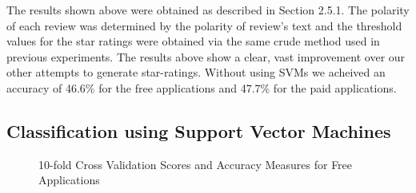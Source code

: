 \documentclass[11pt]{report} %
\begin{document}
The results shown above were obtained as described in Section 2.5.1. The polarity of each review was determined by the polarity of review's text and the threshold values for the star ratings were obtained via the same crude method used in previous experiments. The results above show a clear, vast improvement over our other attempts to generate star-ratings. Without using SVMs we acheived an accuracy of 46.6\% for the free applications and 47.7\% for the paid applications.  

\newpage

		\subsection{Classification using Support Vector Machines}

\begin{figure}[h!]
\centering
{}
\caption[Optional caption for list of figures]{10-fold Cross Validation Scores and Accuracy Measures for Free Applications }
\label{fig:analysis_free}
\end{figure}
\end{document}
